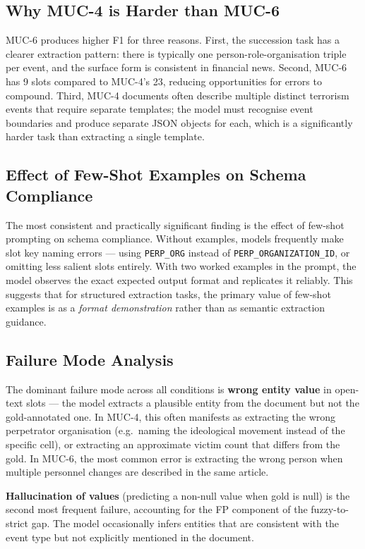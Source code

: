 \documentclass[11pt,a4paper]{article}
\begin{document}
\subsection{Why MUC-4 is Harder than MUC-6}

MUC-6 produces higher F1 for three reasons. First, the succession task has a clearer extraction pattern: there is typically one person-role-organisation triple per event, and the surface form is consistent in financial news. Second, MUC-6 has 9 slots compared to MUC-4's 23, reducing opportunities for errors to compound. Third, MUC-4 documents often describe multiple distinct terrorism events that require separate templates; the model must recognise event boundaries and produce separate JSON objects for each, which is a significantly harder task than extracting a single template.

\subsection{Effect of Few-Shot Examples on Schema Compliance}

The most consistent and practically significant finding is the effect of few-shot prompting on schema compliance. Without examples, models frequently make slot key naming errors — using \texttt{PERP\_ORG} instead of \texttt{PERP\_ORGANIZATION\_ID}, or omitting less salient slots entirely. With two worked examples in the prompt, the model observes the exact expected output format and replicates it reliably. This suggests that for structured extraction tasks, the primary value of few-shot examples is as a \textit{format demonstration} rather than as semantic extraction guidance.

\subsection{Failure Mode Analysis}

The dominant failure mode across all conditions is \textbf{wrong entity value} in open-text slots — the model extracts a plausible entity from the document but not the gold-annotated one. In MUC-4, this often manifests as extracting the wrong perpetrator organisation (e.g.\ naming the ideological movement instead of the specific cell), or extracting an approximate victim count that differs from the gold. In MUC-6, the most common error is extracting the wrong person when multiple personnel changes are described in the same article.

\textbf{Hallucination of values} (predicting a non-null value when gold is null) is the second most frequent failure, accounting for the FP component of the fuzzy-to-strict gap. The model occasionally infers entities that are consistent with the event type but not explicitly mentioned in the document.
\end{document}
